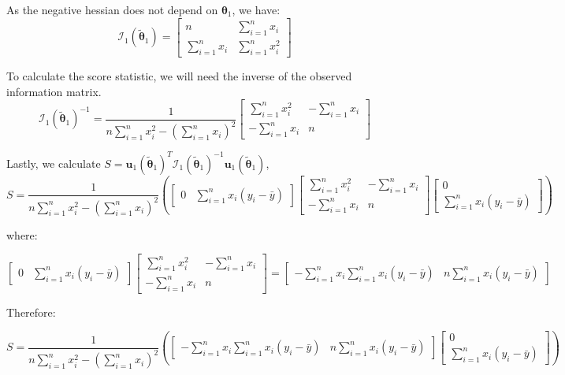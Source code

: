 \documentclass{article}
\newcommand{\thetaOne}{\boldsymbol{\theta}_1}
\newcommand{\thetaOneTilde}{\tilde{\boldsymbol{\theta}}_1}
\newcommand{\scoreU}{\boldsymbol{u}_1 (\thetaOneTilde)}
\newcommand{\scoreI}{\mathcal{I}_1 (\thetaOneTilde)}
\newcommand{\lr}[1]{\left( #1 \right)}
\newcommand{\sumN}{\sum_{i=1}^n}
\newcommand{\yBar}{\bar{y}}
\begin{document}
As the negative hessian does not depend on $\thetaOne$, we have:  
\begin{equation*}
  \mathcal{I}_1 (\thetaOneTilde) =
  \begin{bmatrix}
    n & \sumN x_i \\
    \sumN x_i & \sumN x_i^2
  \end{bmatrix}
\end{equation*}

To calculate the score statistic, we will need the inverse of the
observed information matrix. 
\begin{equation*}
  \scoreI^{-1} = \frac{1}{n \sumN x_i^2 -
    \lr{\sumN x_i}^2}
  \begin{bmatrix}
    \sumN x_i^2 & - \sumN x_i \\
    - \sumN x_i & n
  \end{bmatrix}
\end{equation*}

Lastly, we calculate $S = \scoreU^T \scoreI^{-1} \scoreU$,
\begin{equation*}
  S  = \frac{1}{n \sumN x_i^2 -
    \lr{\sumN x_i}^2} \lr{
  \begin{bmatrix}
    0 & \sumN x_i (y_i - \yBar)
  \end{bmatrix}
  \begin{bmatrix}
    \sumN x_i^2 & - \sumN x_i \\
    - \sumN x_i & n
  \end{bmatrix}
  \begin{bmatrix}
    0 \\
    \sumN x_i (y_i - \yBar)
  \end{bmatrix}
  }
\end{equation*}

where:

\begin{equation*}
  \begin{bmatrix}
    0 & \sumN x_i (y_i - \yBar)
  \end{bmatrix}
  \begin{bmatrix}
    \sumN x_i^2 & - \sumN x_i \\
    - \sumN x_i & n
  \end{bmatrix} =
  \begin{bmatrix}
    -\sumN x_i \sumN x_i(y_i - \yBar) & n \sumN x_i (y_i - \yBar)
  \end{bmatrix}
\end{equation*}

Therefore: 

\begin{equation*}
  S = \frac{1}{n \sumN x_i^2 -
    \lr{\sumN x_i}^2} \lr{
    \begin{bmatrix}
      -\sumN x_i \sumN x_i(y_i - \yBar) & n \sumN x_i (y_i - \yBar)
    \end{bmatrix}
    \begin{bmatrix}
      0 \\
      \sumN x_i (y_i - \yBar)
    \end{bmatrix}
  }
\end{equation*}
\end{document}
